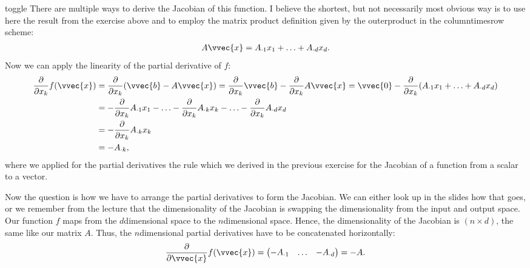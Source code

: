 \documentclass[letterpaper,10pt,english]{jupyterBook}
\begin{document}
\begin{enumerate}
\begin{sphinxuseclass}{toggle}
\sphinxAtStartPar
There are multiple ways to derive the Jacobian of this function. I believe the shortest, but not necessarily most obvious way is to use here the result from the exercise above and to employ the matrix product definition given by the outer\sphinxhyphen{}product in the column\sphinxhyphen{}times\sphinxhyphen{}row scheme:
\begin{equation*}
\begin{split} A\vvec{x} = A_{\cdot 1}x_1 + \ldots + A_{\cdot d}x_d.\end{split}
\end{equation*}
Now we can apply the linearity of the partial derivative of \(f\):
\begin{align*}
    \frac{\partial}{\partial x_k} f(\vvec{x}) 
    &= \frac{\partial}{\partial x_k} (\vvec{b} - A\vvec{x})
    = \frac{\partial}{\partial x_k} \vvec{b} - \frac{\partial}{\partial x_k}A\vvec{x}
    =  \vvec{0} - \frac{\partial}{\partial x_k}(A_{\cdot 1}x_1 + \ldots + A_{\cdot d}x_d)\\
    &= - \frac{\partial}{\partial x_k}A_{\cdot 1}x_1 - \ldots - \frac{\partial}{\partial x_k} A_{\cdot k}x_k-\ldots - \frac{\partial}{\partial x_k}A_{\cdot d}x_d\\
    &=-\frac{\partial}{\partial x_k} A_{\cdot k}x_k\\
    &= -A_{\cdot k},
\end{align*}
\sphinxAtStartPar
where we applied for the partial derivatives the rule which we derived in the previous exercise for the Jacobian of a function from a scalar to a vector.

\sphinxAtStartPar
Now the question is how we have to arrange the partial derivatives to form the Jacobian. We can either look up in the slides how that goes, or we remember from the lecture that the dimensionality of the Jacobian is swapping the dimensionality from the input\sphinxhyphen{} and output space. Our function \(f\) maps from the \(d\)\sphinxhyphen{}dimensional space to the \(n\)\sphinxhyphen{}dimensional space. Hence, the dimensionality of the Jacobian is \((n\times d)\), the same like our matrix \(A\). Thus, the \(n\)\sphinxhyphen{}dimensional partial derivatives have to be concatenated horizontally:
\begin{equation*}
\begin{split}\frac{\partial}{\partial \vvec{x}} f(\vvec{x}) =  \begin{pmatrix} -A_{\cdot 1}&\ldots& -A_{\cdot d}\end{pmatrix} = -A.\end{split}
\end{equation*}


\end{sphinxuseclass}
\end{enumerate}
\end{document}
